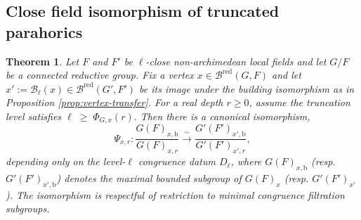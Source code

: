 \documentclass[american]{article}
\numberwithin{equation}{section}
\numberwithin{figure}{section}
\theoremstyle{plain}
\newtheorem{theorem}{Theorem}[section]
\theoremstyle{definition}
\theoremstyle{remark}
\begin{document}
\subsection{Close field isomorphism of truncated parahorics}
\begin{theorem}
\label{thm:depth-comp-HH}
Let $F$ and $F'$ be $\ell$-close non-archimedean local fields and let $G/F$ be a connected reductive group. Fix a vertex $x\in\mathcal{B}^{\mathrm{red}}(G,F)$ and let $x':=\mathcal{B}_\ell(x)\in\mathcal{B}^{\mathrm{red}}(G',F')$ be its image under the building isomorphism as in Proposition \ref{prop:vertex-transfer}. For a real depth $r\ge0$, assume the truncation level satisfies
\(
\ell \;\ge\; \Phi_{G,x}(r). 
\) Then there is a canonical  isomorphism,
\[
  \Psi_{x,r}: \dfrac{G(F)_{x,\mathrm{b}}}{G(F)_{x,r}} \xrightarrow{\;\sim\;} \dfrac{G'(F')_{x',\mathrm{b}}}{G'(F')_{x',r}},
\]
depending only on the level-$\ell$ congruence datum $D_\ell$, where \(G(F)_{x,\mathrm{b}}\) (resp. \(G'(F')_{x',\mathrm{b}}\)) denotes the maximal bounded subgroup of \(G(F)_x\) (resp. \(G'(F')_{x'}\)). The isomorphism is respectful of restriction to minimal congruence filtration subgroups.
\end{theorem}
\end{document}
